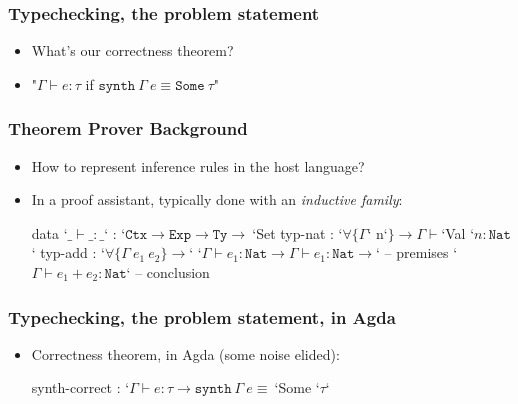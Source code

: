 \documentclass[usenames,dvipsnames]{beamer}
\newcommand{\Exp}{\texttt{Exp}}
\newcommand{\Type}{\texttt{Ty}}
\newcommand{\Ctx}{\texttt{Ctx}}
\newcommand{\synth}{\texttt{synth}}
\newcommand{\Nat}{\texttt{Nat}}
\begin{document}

\begin{frame}
  \frametitle{Typechecking, the problem statement}

  \begin{itemize}
    \item What's our correctness theorem?

    \item "$\Gamma \vdash e : \tau$ if $\synth\ \Gamma\ e \equiv \texttt{Some}\ \tau$"
  \end{itemize}
\end{frame}


\begin{frame}[fragile]
  \frametitle{Theorem Prover Background}

  \begin{itemize}
    \item How to represent inference rules in the host language?

    \item In a proof assistant, typically done with an \emph{inductive family}:
      \begin{code}
        data `$\_\vdash\_:\_$` : `$\Ctx \rightarrow \Exp \rightarrow \Type \rightarrow\ $`Set
          typ-nat : `$\forall \{\Gamma$` n`$\} \rightarrow \Gamma \vdash $`Val `$n : \Nat$`
          typ-add : `$\forall \{\Gamma\ e_1\ e_2\} \rightarrow$`
            `$\Gamma \vdash e_1 : \Nat \rightarrow \Gamma \vdash e_1 : \Nat \rightarrow$` -- premises
            `$\Gamma \vdash e_1 + e_2 : \Nat$` -- conclusion
      \end{code}
  \end{itemize}
\end{frame}


\begin{frame}[fragile]
  \frametitle{Typechecking, the problem statement, in Agda}

  \begin{itemize}
    \item Correctness theorem, in Agda (some noise elided):
      \begin{code}
        synth-correct : `$\Gamma \vdash e : \tau \rightarrow \synth\ \Gamma\ e \equiv\ $`Some `$\tau$`
      \end{code}
  \end{itemize}
\end{frame}
\end{document}
